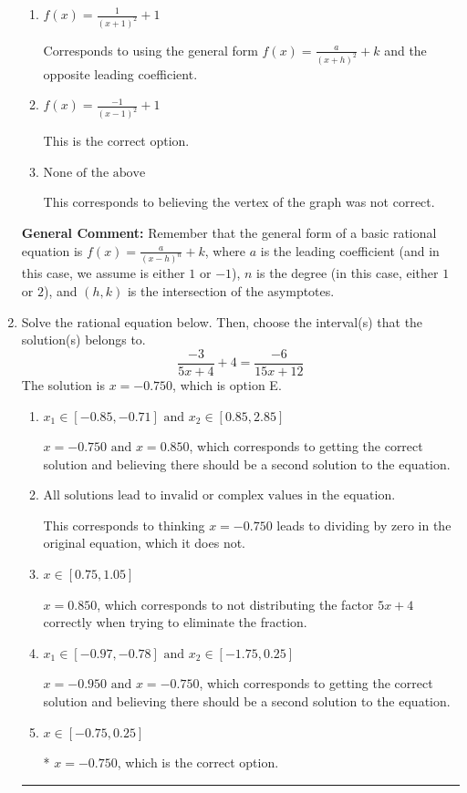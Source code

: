 \documentclass{extbook}[14pt]
\newcommand{\litem}[1]{\item #1

\rule{\textwidth}{0.4pt}}
\begin{document}
\begin{enumerate}
{\begin{enumerate}[label=\Alph*.]
Corresponds to thinking the graph was a shifted version of $\frac{1}{x}$.
\item \( f(x) = \frac{1}{(x + 1)^2} + 1 \)

Corresponds to using the general form $f(x) = \frac{a}{(x+h)^2}+k$ and the opposite leading coefficient.
\item \( f(x) = \frac{-1}{(x - 1)^2} + 1 \)

This is the correct option.
\item \( \text{None of the above} \)

This corresponds to believing the vertex of the graph was not correct.
\end{enumerate}

\textbf{General Comment:} Remember that the general form of a basic rational equation is $ f(x) = \frac{a}{(x-h)^n} + k$, where $a$ is the leading coefficient (and in this case, we assume is either $1$ or $-1$), $n$ is the degree (in this case, either $1$ or $2$), and $(h, k)$ is the intersection of the asymptotes.
}
\litem{
Solve the rational equation below. Then, choose the interval(s) that the solution(s) belongs to.
\[ \frac{-3}{5x + 4} + 4 = \frac{-6}{15x + 12} \]The solution is \( x = -0.750 \), which is option E.\begin{enumerate}[label=\Alph*.]
\item \( x_1 \in [-0.85, -0.71] \text{ and } x_2 \in [0.85,2.85] \)

$x = -0.750 \text{ and } x = 0.850$, which corresponds to getting the correct solution and believing there should be a second solution to the equation.
\item \( \text{All solutions lead to invalid or complex values in the equation.} \)

This corresponds to thinking $x = -0.750$ leads to dividing by zero in the original equation, which it does not.
\item \( x \in [0.75,1.05] \)

$x = 0.850$, which corresponds to not distributing the factor $5x + 4$ correctly when trying to eliminate the fraction.
\item \( x_1 \in [-0.97, -0.78] \text{ and } x_2 \in [-1.75,0.25] \)

$x = -0.950 \text{ and } x = -0.750$, which corresponds to getting the correct solution and believing there should be a second solution to the equation.
\item \( x \in [-0.75,0.25] \)

* $x = -0.750$, which is the correct option.
\end{enumerate}

}
\end{enumerate}
\end{document}
